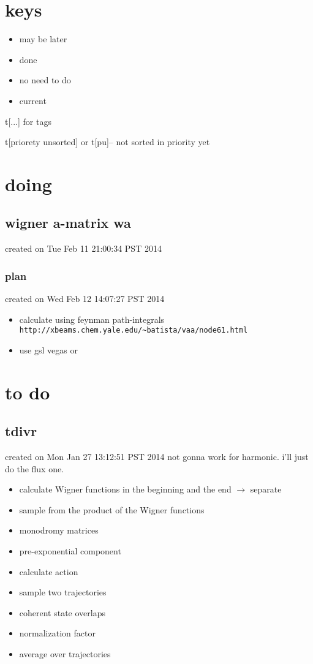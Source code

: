 \documentclass{article}
\let\Item\item
\renewcommand\item{\normalcolor\Item}
\newcommand\ml{\color[RGB]{153, 150, 204}} %
\newcommand\nn{\color[RGB]{124, 124, 255}} %
\newcommand\done{\color[RGB]{129, 180, 185} \ding{52} }
\newcommand\now{\color[RGB]{255, 0, 0}} %
\begin{document}
\section{keys}
\begin{itemize}
  \item \ml may be later
  \item \done done
  \item \nn no need to do
  \item \now current 
\end{itemize}

t[...] for tags

t[priorety unsorted] or t[pu]-- not sorted in priority yet

\section{doing}
\subsection{wigner a-matrix wa}
created on Tue Feb 11 21:00:34 PST 2014
\label{sub:wigner_a_matrix_wa}
\subsubsection{plan}
created on Wed Feb 12 14:07:27 PST 2014
\label{ssub:plam}
\begin{itemize}
  \item calculate using feynman path-integrals \verb`http://xbeams.chem.yale.edu/~batista/vaa/node61.html`
  \item use gsl vegas or 
\end{itemize}
\section{to do}
\subsection{tdivr}
created on Mon Jan 27 13:12:51 PST 2014
\label{sub:tdivr}
not gonna work for harmonic. i'll just do the flux one.
\begin{itemize}
  \item \now calculate Wigner functions in the beginning and the end $\to$ separate
  \item sample from the product of the Wigner functions
  \item monodromy matrices
  \item pre-exponential component
  \item calculate action
  \item sample two trajectories
  \item coherent state overlaps
  \item normalization factor
  \item average over trajectories
\end{itemize}
\end{document}
